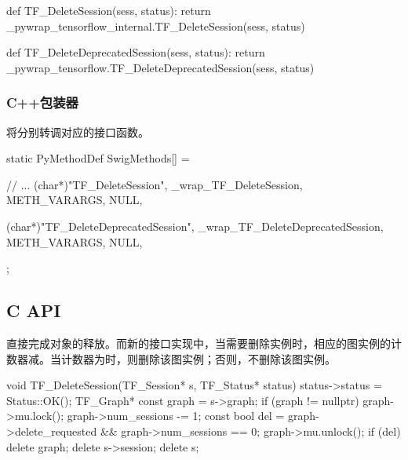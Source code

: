 \begin{content}
\begin{leftbar}
\begin{python}[caption={tensorflow/bazel-bin/tensorflow/python/pywrap\_tensorflow\_internal.py}]
def TF_DeleteSession(sess, status):
    return _pywrap_tensorflow_internal.TF_DeleteSession(sess, status)

def TF_DeleteDeprecatedSession(sess, status):
  return _pywrap_tensorflow.TF_DeleteDeprecatedSession(sess, status)
\end{python}
\end{leftbar}

\subsubsection{C++包装器}

将分别转调对应的接口函数。

\begin{leftbar}
\begin{c++}[caption={tensorflow/bazel-bin/tensorflow/python/pywrap\_tensorflow\_internal.cc}]
static PyMethodDef SwigMethods[] = {
  // ...
  { (char*)"TF_DeleteSession", 
    _wrap_TF_DeleteSession, METH_VARARGS, NULL},

  { (char*)"TF_DeleteDeprecatedSession", 
    _wrap_TF_DeleteDeprecatedSession, METH_VARARGS, NULL},
};
\end{c++}
\end{leftbar}

\subsection{C API}

直接完成对象的释放。而新的接口实现中，当需要删除实例时，相应的图实例的计数器减。当计数器为时，则删除该图实例；否则，不删除该图实例。

\begin{leftbar}
\begin{c++}[caption={tensorflow/c/c\_api.c}]
void TF_DeleteSession(TF_Session* s, TF_Status* status) {
  status->status = Status::OK();
  TF_Graph* const graph = s->graph;
  if (graph != nullptr) {
    graph->mu.lock();
    graph->num_sessions -= 1;
    const bool del = graph->delete_requested && graph->num_sessions == 0;
    graph->mu.unlock();
    if (del) delete graph;
  }
  delete s->session;
  delete s;
}


\end{c++}
\end{leftbar}
\end{content}
